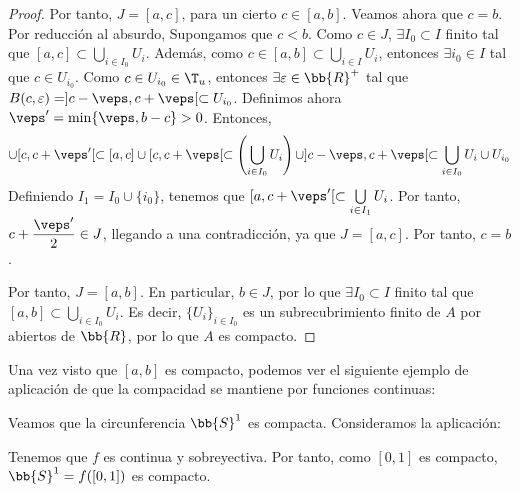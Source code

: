 \begin{proof}
    Por tanto, $J=[a,c]$, para un cierto $c\in [a,b]$. Veamos ahora que $c=b$. Por reducción al absurdo, Supongamos que $c<b$.
    Como $c\in J$, $\exists I_0\subset I$ finito tal que $[a,c]\subset \bigcup\limits_{i\in I_0}U_i$.
    Además, como $c\in [a,b] \subset \bigcup\limits_{i\in I}U_i$, entonces $\exists i_0\in I$ tal que $c\in U_{i_0}$. Como $c\in U_{i_0}\in \T_u$,
    entonces $\exists \varepsilon\in \bb{R}^+$ tal que $B(c,\varepsilon)=]c-\veps,c+\veps[\subset U_{i_0}$. Definimos ahora $\veps' = \min\{\veps, b-c\}> 0$. Entonces,
    \begin{equation*}
        [a, c+\veps'[ = [a,c]\cup [c,c+\veps'[ \subset [a,c]\cup [c,c+\veps[ \subset
        \left(\bigcup_{i\in I_0}U_i\right) \cup ]c-\veps,c+\veps[ \subset \bigcup_{i\in I_0}U_i \cup U_{i_0}
    \end{equation*}
    Definiendo $I_1=I_0\cup \{i_0\}$, tenemos que $[a,c+\veps'[\subset \bigcup\limits_{i\in I_1}U_i$.
    Por tanto, $c+\dfrac{\veps'}{2}\in J$, llegando a una contradicción, ya que $J=[a,c]$. Por tanto, $c=b$.

    Por tanto, $J=[a,b]$. En particular, $b\in J$, por lo que $\exists I_0\subset I$ finito tal que $[a,b]\subset \bigcup\limits_{i\in I_0}U_i$.
    Es decir, $\{U_i\}_{i\in I_0}$ es un subrecubrimiento finito de $A$ por abiertos de $\bb{R}$, por lo que $A$ es compacto.    
\end{proof}

Una vez visto que $[a,b]$ es compacto, podemos ver el siguiente ejemplo de aplicación de que la compacidad se mantiene por funciones continuas:
\begin{ejemplo}
    Veamos que la circunferencia $\bb{S}^1$ es compacta. Consideramos la aplicación:

    Tenemos que $f$ es continua y sobreyectiva. Por tanto, como $[0,1]$ es compacto, $\bb{S}^1=f([0,1])$ es compacto.
\end{ejemplo}



